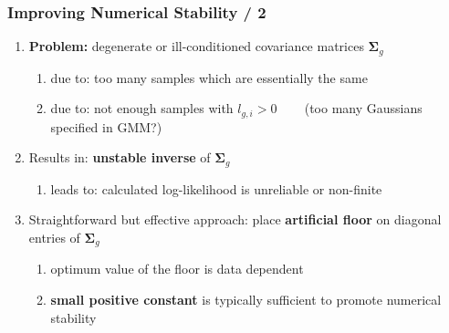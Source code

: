 \documentclass[usenames,dvipsnames]{beamer}
\def\Mat#1{{\boldsymbol{#1}}}
\begin{document}
\begin{frame}
\frametitle{Improving Numerical Stability / 2}

\begin{enumerate}[{~~$\boldsymbol{\bullet}$}]

\item {\bf Problem:} degenerate or ill-conditioned covariance matrices $\Mat{\Sigma}_g$

\begin{enumerate}[{$\boldsymbol{\rightarrow}$}]
\renewcommand{\itemsep}{1ex}
\item due to: too many samples which are essentially the same
\item due to: not enough samples with $l_{g,i} > 0$ ~~~ (too many Gaussians specified in GMM?)
\end{enumerate}
\vspace{1ex}


\item Results in: {\bf unstable inverse} of $\Mat{\Sigma}_g$

\begin{enumerate}[{$\boldsymbol{\rightarrow}$}]
\renewcommand{\itemsep}{1ex}
\item leads to: calculated log-likelihood is unreliable or non-finite
\end{enumerate}
\vspace{1ex}


\item Straightforward but effective approach: place {\bf artificial floor} on diagonal entries of $\Mat{\Sigma}_g$

\begin{enumerate}[{$\boldsymbol{\rightarrow}$}]
\renewcommand{\itemsep}{1ex}
\item optimum value of the floor is data dependent
\item {\bf small positive constant} is typically sufficient to promote numerical stability
\end{enumerate}


\end{enumerate}
\end{frame}
%
%
%
\end{document}
